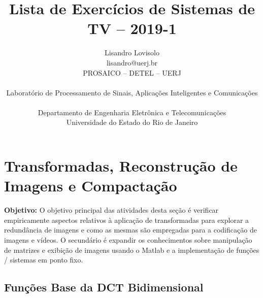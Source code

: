 \documentclass[11pt]{article}
\begin{document}
 

\title{Lista de Exercícios de Sistemas de TV -- 2019-1}
\author{Lisandro Lovisolo \\ lisandro@uerj.br \\ PROSAICO -- DETEL -- UERJ \\ \begin{small} Laboratório de Processamento de Sinais, Aplicações Inteligentes e Comunicações \end{small} \\ Departamento de Engenharia Eletrônica e Telecomunicações \\ Universidade do Estado do Rio de Janeiro}

\maketitle

\section{Transformadas, Reconstrução de Imagens e Compactação}

\textbf{Objetivo:} O objetivo principal das atividades desta seção é verificar empiricamente aspectos relativos à aplicação de transformadas para explorar a redundância de imagens e como as mesmas são empregadas para a codificação de imagens e vídeos. O secundário é expandir os conhecimentos sobre manipulação de matrizes e exibição de imagens usando o \textsf{Matlab} e a implementação de funções / sistemas em ponto fixo.

\subsection{Funções Base da DCT Bidimensional}
\end{document}
